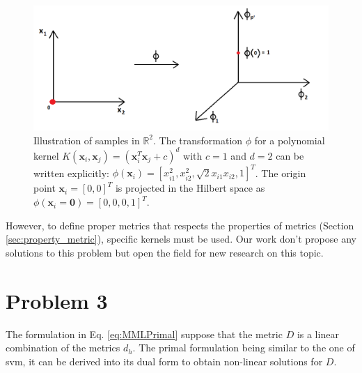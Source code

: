 \begin{figure}[h!]
	\centering
	\includegraphics[width=0.9\linewidth]{images/Kernel_nonHomogene}
	\caption{Illustration of samples in $\mathbb{R}^2$. The transformation $\phi$ for a polynomial kernel $K(\textbf{x}_i,\textbf{x}_j)=(\textbf{x}_i^T \textbf{x}_j + c)^d$ with $c=1$ and $d=2$ can be written explicitly: $\phi(\textbf{x}_i)= [x_{i1}^2, x_{i2}^2, \sqrt{2} x_{i1} x_{i2}, 1]^T$. The origin point $\textbf{x}_i=[0,0]^T$ is projected in the Hilbert space as $\phi(\textbf{x}_i=\textbf{0}) = [0, 0, 0, 1]^T$.}
	\label{fig:Kernel_nonHomogene}
\end{figure}

However, to define proper metrics that respects the properties of metrics (Section \ref{sec:property_metric}), specific kernels must be used. Our work don't propose any solutions to this problem but open the field for new research on this topic. 


\section{Problem 3}


The formulation in Eq. \ref{eq:MMLPrimal} suppose that the metric $D$ is a linear combination of the metrics $d_h$. The primal formulation being similar to the one of {\sc svm}, it can be derived into its dual form to obtain non-linear solutions for $D$.

